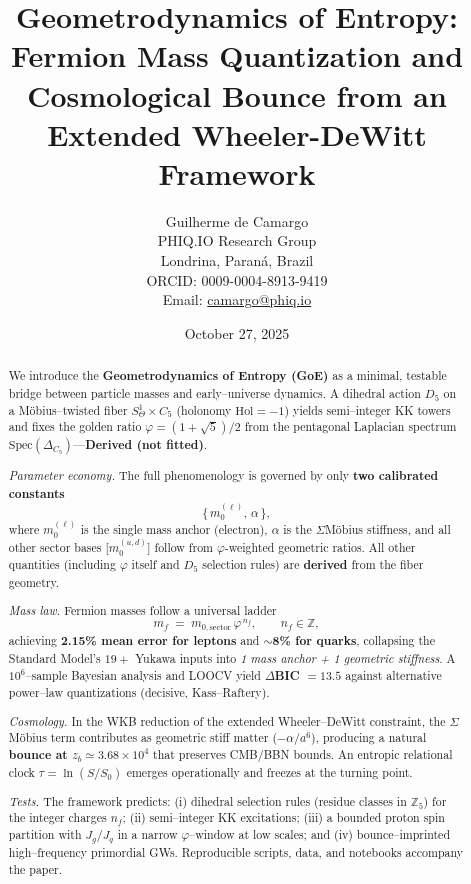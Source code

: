 \documentclass[12pt]{article}
\title{Geometrodynamics of Entropy: Fermion Mass Quantization and Cosmological Bounce from an Extended Wheeler-DeWitt Framework}
\author{Guilherme de Camargo\\
PHIQ.IO Research Group\\
Londrina, Paraná, Brazil\\
ORCID: 0009-0004-8913-9419\\
Email: \href{mailto:camargo@phiq.io}{camargo@phiq.io}}
\date{October 27, 2025}
\theoremstyle{definition}
\theoremstyle{plain}
\newcommand{\Moebius}{M\"obius}
\newcommand{\SigMoeb}{\ensuremath{\Sigma}\text{--}\Moebius}
\begin{document}
\maketitle

\begin{abstract}
We introduce the \textbf{Geometrodynamics of Entropy (GoE)} as a minimal, testable bridge between particle masses and early--universe dynamics. A dihedral action $D_5$ on a \Moebius{}--twisted fiber $S^1_\Theta \times C_5$ (holonomy $\mathrm{Hol}=-1$) yields semi--integer KK towers and fixes the golden ratio $\varphi=(1+\sqrt{5})/2$ from the pentagonal Laplacian spectrum $\mathrm{Spec}(\Delta_{C_5})$—\textbf{Derived (not fitted)}.

\textit{Parameter economy.} The full phenomenology is governed by only \textbf{two calibrated constants}
\[
\{\,m_{0}^{(\ell)},\,\alpha\,\},
\]
where $m_0^{(\ell)}$ is the single mass anchor (electron), $\alpha$ is the \SigMoeb{} stiffness, and all other sector bases [$m_0^{(u,d)}$] follow from $\varphi$-weighted geometric ratios. All other quantities (including $\varphi$ itself and $D_5$ selection rules) are \textbf{derived} from the fiber geometry.

\textit{Mass law.} Fermion masses follow a universal ladder
\[
m_f \;=\; m_{0,\text{sector}}\,\varphi^{\,n_f},\qquad n_f\in\mathbb{Z},
\]
achieving \textbf{2.15\% mean error for leptons} and \textbf{$\sim$8\% for quarks}, collapsing the Standard Model's $19{+}$ Yukawa inputs into \textit{1 mass anchor + 1 geometric stiffness}. A $10^6$–sample Bayesian analysis and LOOCV yield \textbf{$\Delta$BIC $=13.5$} against alternative power–law quantizations (decisive, Kass--Raftery).

\textit{Cosmology.} In the WKB reduction of the extended Wheeler--DeWitt constraint, the \SigMoeb{} term contributes as geometric stiff matter ($-\alpha/a^6$), producing a natural \textbf{bounce at $z_b\simeq3.68\times10^4$} that preserves CMB/BBN bounds. An entropic relational clock $\tau=\ln(S/S_0)$ emerges operationally and freezes at the turning point.

\textit{Tests.} The framework predicts: (i) dihedral selection rules (residue classes in $\mathbb{Z}_5$) for the integer charges $n_f$; (ii) semi--integer KK excitations; (iii) a bounded proton spin partition with $J_g/J_q$ in a narrow $\varphi$–window at low scales; and (iv) bounce–imprinted high–frequency primordial GWs. Reproducible scripts, data, and notebooks accompany the paper.
\end{abstract}
\end{document}
